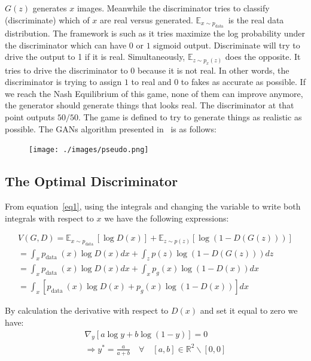 \documentclass[]{IEEEtran}
\begin{document}
$G(z)$ generates $x$ images. Meanwhile the discriminator tries to classify (discriminate) which of $x$ are real versus generated. $\mathbb{E}_{x \sim p_{\text {data }}}$ is the real data distribution. The framework is such as it tries maximize the log probability under the discriminator which can have $0$ or $1$ sigmoid output. Discriminate will try to drive the output to 1 if it is real. Simultaneously, $\mathbb{E}_{z \sim p_{x}(z)}$ does the opposite. It tries to drive the discriminator to $0$ because it is not real. In other words, the discriminator is trying to assign $1$ to real and $0$ to fakes as accurate as possible. If we reach the Nash Equilibrium of this game, none of them can improve anymore, the generator should generate things that looks real. The discriminator at that point outputs $50/50$.
The game is defined to try to generate things as realistic as possible. The GANs algorithm presented in~\cite{Goodfellow2014GenerativeAN} is as follows: 

\begin{figure}[h]
\centering
\texttt{[image: ./images/pseudo.png]}
\hspace{1mm}
\label{code}
\end{figure}


\subsection{The Optimal Discriminator}
 From equation~\ref{eq1}, using the integrals and changing the variable to write both integrals with respect to $x$ we have the following expressions:

\begin{equation}
\begin{split}
V(G, D) =\mathbb{E}_{x \sim p_{\text {data }}}[\log D(x)]+\mathbb{E}_{z \sim p(z)}[\log (1-D(G(z)))] \\
=\int_{x} p_{\text {data }}(x) \log D(x) d x+\int_{z} p(z) \log (1-D(G(z))) dz \\
=\int_{x} p_{\text {data }}(x) \log D(x) d x+\int_{x} p_{g}(x) \log (1-D(x)) dx \\
=\int_{x}\left[p_{\text {data }}(x) \log D(x)+p_{g}(x) \log (1-D(x))\right] dx
\end{split}
\end{equation}

By calculation the derivative with respect to $D(x)$ and set it equal to zero we have:
\begin{equation}
\begin{split}
\nabla_{y}[a \log y+b \log (1-y)]=0 \\
\Longrightarrow y^{*}=\frac{a}{a+b} \quad \forall \quad[a, b] \in \mathbb{R}^{2} \backslash[0,0]
\end{split}
\end{equation}
\end{document}
